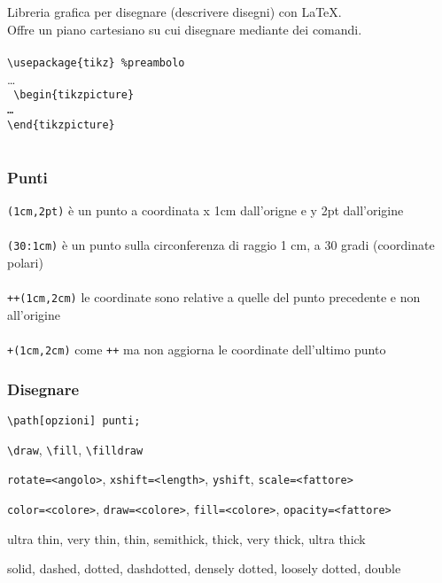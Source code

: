 \section{\Tikz}
\begin{frame}\centering
\frametitle{\Tikz}
  Libreria grafica per disegnare (descrivere disegni) con \LaTeX.\\\pause
  Offre un piano cartesiano su cui disegnare mediante dei comandi.\\~\\\pause
  \texttt{\textbackslash{}usepackage\{tikz\} \%preambolo}\\\pause
  \dots\\\texttt{
  \textbackslash{}begin\{tikzpicture\}\\
  \dots\\
  \textbackslash{}end\{tikzpicture\}~~\\~}
\end{frame}
\begin{frame}\centering
\frametitle{Punti}
  \texttt{(1cm,2pt)} è un punto a coordinata x 1cm dall'origne e y 2pt dall'origine\\~\\\pause
  \texttt{(30:1cm)} è un punto sulla circonferenza di raggio 1 cm, a 30 gradi (coordinate polari)\\~\\\pause
  \texttt{++(1cm,2cm)} le coordinate sono relative a quelle del punto precedente e non all'origine\\~\\\pause
  \texttt{+(1cm,2cm)} come \texttt{++} ma non aggiorna le coordinate dell'ultimo punto
\end{frame}
\begin{frame}\centering
\frametitle{Disegnare}
  \texttt{\textbackslash{}path[opzioni] punti;}\\\pause
  \begin{description}
    \item<2->[path type] \texttt{\textbackslash{}draw}, \texttt{\textbackslash{}fill}, \texttt{\textbackslash{}filldraw}
    \item<3->[geometria] \texttt{rotate=<angolo>}, \texttt{xshift=<length>}, \texttt{yshift}, \texttt{scale=<fattore>}
    \item<4->[colore] \texttt{color=<colore>}, \texttt{draw=<colore>}, \texttt{fill=<colore>}, \texttt{opacity=<fattore>}
    \item<5->[spessore linee] ultra thin, very thin, thin, semithick, thick, very thick, ultra thick
    \item<6->[tratteggio] solid, dashed, dotted, dashdotted, densely dotted, loosely dotted, double
  \end{description}
\end{frame}
